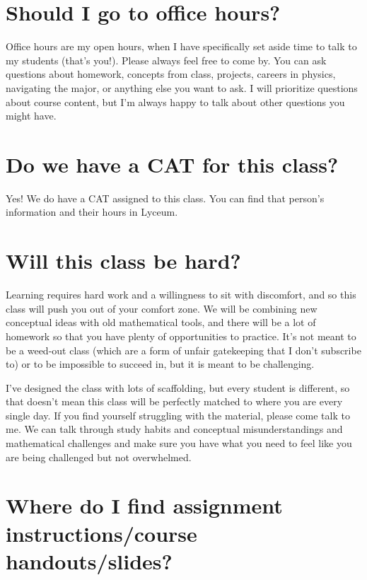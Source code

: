 \documentclass[
  letterpaper,
  DIV=11,
  numbers=noendperiod]{scrartcl}
\begin{document}
\section{Should I go to office hours?}\label{goingtoofficehours}

Office hours are my open hours, when I have specifically set aside time
to talk to my students (that's you!). Please always feel free to come
by. You can ask questions about homework, concepts from class, projects,
careers in physics, navigating the major, or anything else you want to
ask. I will prioritize questions about course content, but I'm always
happy to talk about other questions you might have.

\section{Do we have a CAT for this class?}\label{cat}

Yes! We do have a CAT assigned to this class. You can find that person's
information and their hours in Lyceum.

\section{Will this class be hard?}\label{classdifficulty}

Learning requires hard work and a willingness to sit with discomfort,
and so this class will push you out of your comfort zone. We will be
combining new conceptual ideas with old mathematical tools, and there
will be a lot of homework so that you have plenty of opportunities to
practice. It's not meant to be a weed-out class (which are a form of
unfair gatekeeping that I don't subscribe to) or to be impossible to
succeed in, but it is meant to be challenging.

I've designed the class with lots of scaffolding, but every student is
different, so that doesn't mean this class will be perfectly matched to
where you are every single day. If you find yourself struggling with the
material, please come talk to me. We can talk through study habits and
conceptual misunderstandings and mathematical challenges and make sure
you have what you need to feel like you are being challenged but not
overwhelmed.

\section{Where do I find assignment instructions/course
handouts/slides?}\label{findstuff}
\end{document}
